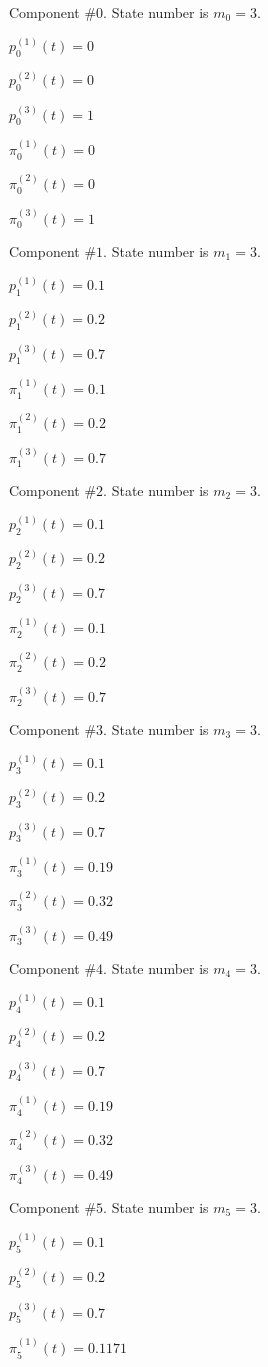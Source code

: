 

 Component #$0$. State number is $m_0=3$.

 $p^{(1)}_0(t)=0$

 $p^{(2)}_0(t)=0$

 $p^{(3)}_0(t)=1$

 $\pi^{(1)}_0(t)=0$

 $\pi^{(2)}_0(t)=0$

 $\pi^{(3)}_0(t)=1$

 Component #$1$. State number is $m_1=3$.

 $p^{(1)}_1(t)=0.1$

 $p^{(2)}_1(t)=0.2$

 $p^{(3)}_1(t)=0.7$

 $\pi^{(1)}_1(t)=0.1$

 $\pi^{(2)}_1(t)=0.2$

 $\pi^{(3)}_1(t)=0.7$

 Component #$2$. State number is $m_2=3$.

 $p^{(1)}_2(t)=0.1$

 $p^{(2)}_2(t)=0.2$

 $p^{(3)}_2(t)=0.7$

 $\pi^{(1)}_2(t)=0.1$

 $\pi^{(2)}_2(t)=0.2$

 $\pi^{(3)}_2(t)=0.7$

 Component #$3$. State number is $m_3=3$.

 $p^{(1)}_3(t)=0.1$

 $p^{(2)}_3(t)=0.2$

 $p^{(3)}_3(t)=0.7$

 $\pi^{(1)}_3(t)=0.19$

 $\pi^{(2)}_3(t)=0.32$

 $\pi^{(3)}_3(t)=0.49$

 Component #$4$. State number is $m_4=3$.

 $p^{(1)}_4(t)=0.1$

 $p^{(2)}_4(t)=0.2$

 $p^{(3)}_4(t)=0.7$

 $\pi^{(1)}_4(t)=0.19$

 $\pi^{(2)}_4(t)=0.32$

 $\pi^{(3)}_4(t)=0.49$

 Component #$5$. State number is $m_5=3$.

 $p^{(1)}_5(t)=0.1$

 $p^{(2)}_5(t)=0.2$

 $p^{(3)}_5(t)=0.7$

 $\pi^{(1)}_5(t)=0.1171$

